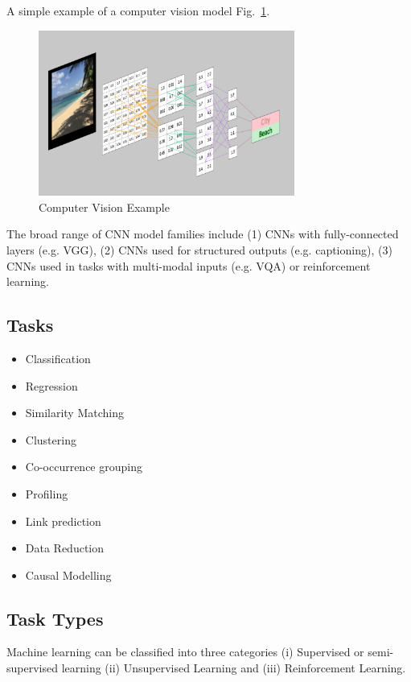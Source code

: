 A simple example of a computer vision model Fig.~\ref{fig:CNN-2}.
\begin{figure}[htbp]
\centering
\includegraphics[width=0.75\textwidth]{images/CNN.png}
\caption{Computer Vision Example}
\label{fig:CNN-2}
\end{figure}

The broad range of CNN model families include (1) CNNs with fully-connected layers (e.g. VGG), (2) CNNs used for structured outputs (e.g. captioning), (3) CNNs used in tasks with multi-modal inputs (e.g. VQA) or reinforcement learning.

\vspace{15mm}

\subsection{Tasks}
\begin{itemize}
\item Classification
\item Regression
\item Similarity Matching
\item Clustering
\item Co-occurrence grouping
\item Profiling
\item Link prediction
\item Data Reduction
\item Causal Modelling
\end{itemize}

\subsection{Task Types}

Machine learning can be classified into three categories (i) Supervised or semi-supervised learning (ii) Unsupervised Learning and (iii) Reinforcement Learning.

